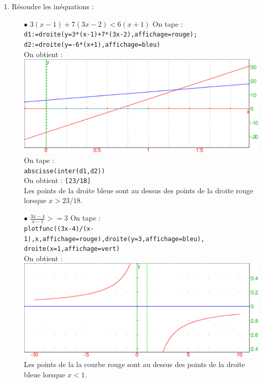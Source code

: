 \documentclass[a4paper,11pt]{book}
\begin{document}
\begin{enumerate}
\begin{itemize}
{\tt abscisse(inter(G2,droite(y=0)))}\\
On obtient :
{\tt [-2/3,1/18]}
\end{itemize}
\item R\'esoudre les in\'equations :
\begin{itemize}
\item[$\bullet$] $3(x-1)+7(3x-2)<6(x+1)$
On tape :\\
{\tt d1:=droite(y=3*(x-1)+7*(3x-2),affichage=rouge);}\\
{\tt d2:=droite(y=-6*(x+1),affichage=bleu)}\\
On obtient :\\
\includegraphics[width=\textwidth]{equagraph3}\\
On tape :\\
{\tt abscisse(inter(d1,d2))}\\
On obtient :
{\tt [23/18]}\\
Les points de la droite bleue sont au dessus des points de la droite rouge lorsque $x>23/18$.
\item[$\bullet$] $\displaystyle \frac{3x-4}{x-1}>=3$
On tape :\\
{\tt plotfunc((3x-4)/(x-1),x,affichage=rouge),droite(y=3,affichage=bleu),\\ droite(x=1,affichage=vert)}\\
On obtient :\\
\includegraphics[width=\textwidth]{equagraph4}\\
Les points de la la courbe rouge sont au dessus des points de la droite bleue lorsque $x<1$.
\end{itemize}
\end{enumerate}
\end{document}
